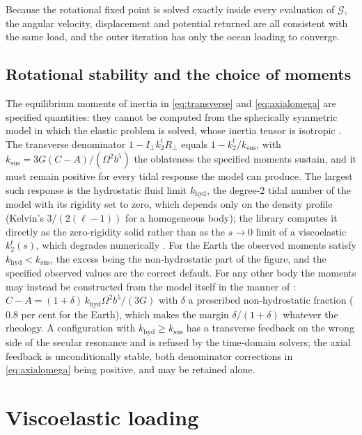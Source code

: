 \documentclass[11pt,a4paper]{article}
\numberwithin{equation}{section}
\begin{document}
Because the rotational fixed point is solved exactly inside every evaluation of
$\mathcal{G}$, the angular velocity, displacement and potential returned are all
consistent with the same load, and the outer iteration has only the ocean
loading to converge.

\subsection{Rotational stability and the choice of moments}

The equilibrium moments of inertia in \eqref{eq:transverse} and
\eqref{eq:axialomega} are specified quantities: they cannot be computed from
the spherically symmetric model in which the elastic problem is solved, whose
inertia tensor is isotropic \citep{YuEtAl2025}. The transverse denominator
$1-I_{\perp}k^{t}_{2}R_{\perp}$ equals $1-k^{t}_{2}/k_{\mathrm{sus}}$, with
$k_{\mathrm{sus}}=3G(C-A)/(\Omega^{2}b^{5})$ the oblateness the specified
moments sustain, and it must remain positive for every tidal response the
model can produce. The largest such response is the hydrostatic fluid limit
$k_{\mathrm{hyd}}$, the degree-2 tidal number of the model with its rigidity
set to zero, which depends only on the density profile (Kelvin's
$3/(2(\ell-1))$ for a homogeneous body); the library computes it directly as
the zero-rigidity solid rather than as the $s\to0$ limit of a viscoelastic
$k^{t}_{2}(s)$, which degrades numerically \citep{MitrovicaEtAl2005}. For the
Earth the observed moments satisfy $k_{\mathrm{hyd}}<k_{\mathrm{sus}}$, the
excess being the non-hydrostatic part of the figure, and the specified
observed values are the correct default. For any other body the moments may
instead be constructed from the model itself in the manner of
\citet{MitrovicaEtAl2005}: $C-A=(1+\delta)\,k_{\mathrm{hyd}}\Omega^{2}b^{5}/(3G)$
with $\delta$ a prescribed non-hydrostatic fraction ($0.8$ per cent for the
Earth), which makes the margin $\delta/(1+\delta)$ whatever the rheology.
A configuration with $k_{\mathrm{hyd}}\ge k_{\mathrm{sus}}$ has a transverse
feedback on the wrong side of the secular resonance and is refused by the
time-domain solvers; the axial feedback is unconditionally stable, both
denominator corrections in \eqref{eq:axialomega} being positive, and may be
retained alone.

\section{Viscoelastic loading}
\label{sec:visco}
\end{document}
